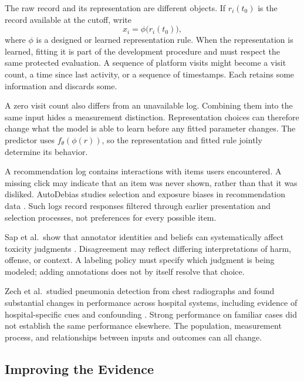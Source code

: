 The raw record and its representation are different objects. If $r_i(t_0)$ is the record available at the cutoff, write
\[
x_i=\phi\bigl(r_i(t_0)\bigr),
\]
where $\phi$ is a designed or learned representation rule. When the representation is learned, fitting it is part of the development procedure and must respect the same protected evaluation. A sequence of platform visits might become a visit count, a time since last activity, or a sequence of timestamps. Each retains some information and discards some.

A zero visit count also differs from an unavailable log. Combining them into the same input hides a measurement distinction. Representation choices can therefore change what the model is able to learn before any fitted parameter changes. The predictor uses $f_\theta(\phi(r))$, so the representation and fitted rule jointly determine its behavior.

\begin{example}
A recommendation log contains interactions with items users encountered. A missing click may indicate that an item was never shown, rather than that it was disliked. AutoDebias studies selection and exposure biases in recommendation data \citep{autodebias2021}. Such logs record responses filtered through earlier presentation and selection processes, not preferences for every possible item.
\end{example}

\begin{example}
Sap et al.\ show that annotator identities and beliefs can systematically affect toxicity judgments \citep{sap2022}. Disagreement may reflect differing interpretations of harm, offense, or context. A labeling policy must specify which judgment is being modeled; adding annotations does not by itself resolve that choice.
\end{example}

Zech et al.\ studied pneumonia detection from chest radiographs and found substantial changes in performance across hospital systems, including evidence of hospital-specific cues and confounding \citep{zech2018}. Strong performance on familiar cases did not establish the same performance elsewhere. The population, measurement process, and relationships between inputs and outcomes can all change.

\subsection{Improving the Evidence}

